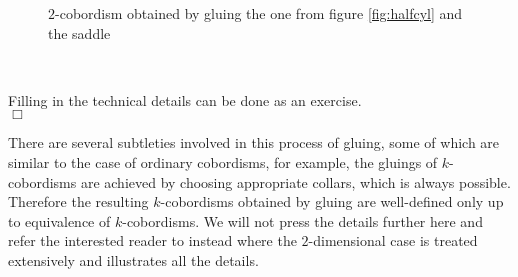 \begin{exa}
\begin{figure}[h!]
\caption{$2$-cobordism obtained by gluing the one from figure \ref{fig:halfcyl} and the saddle}
\label{fig:glued}
\end{figure}
\\
\end{exa}
\begin{prf}
Filling in the technical details can be done as an exercise.
\\
\phantom{proven}
\hfill
$\Box$
\end{prf}
There are several subtleties involved in this process of gluing, some of which are similar to the case of ordinary cobordisms, for example, the gluings of $k$-cobordisms are achieved by choosing appropriate collars, which is always possible. Therefore the resulting $k$-cobordisms obtained by gluing are well-defined only up to equivalence of $k$-cobordisms. We will not press the details further here and refer the interested reader to \cite{d37d0fca} instead where the $2$-dimensional case is treated extensively and illustrates all the details.
